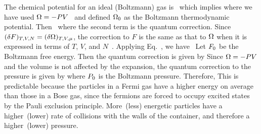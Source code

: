 {	The chemical potential for an ideal (Boltzmann) gas is~\cite[pp.~127, 151]{Landau}
	which implies
	where we have used $\Omega = -P V$~\cite[p.~69]{Landau} and defined $\Omega_0$ as the Boltzmann thermodynamic potential.  Then~\cite[p.~151]{Landau}
	where the second term is the quantum correction.  Since $(\delta F)_{T, V, N} = (\delta \Omega)_{T, V, \mu}$, the correction to $F$ is the same as that to $\Omega$ when it is expressed in terms of $T$, $V$, and $N$~\cite[pp.~69, 151]{Landau}.  Applying Eq.~, we have~\cite[p.~151]{Landau}
	Let $F_0$ be the Boltzmann free energy.  Then the quantum correction is given by
	Since $\Omega = -P V$ and the volume is not affected by the expansion, the quantum correction to the pressure is given by
	where $P_0$ is the Boltzmann pressure.  Therefore,  This is predictable because the particles in a Fermi gas have a higher energy on average than those in a Bose gas, since the fermions are forced to occupy excited states by the Pauli exclusion principle.  More~(less) energetic particles have a higher~(lower) rate of collisions with the walls of the container, and therefore a higher~(lower) pressure.
}